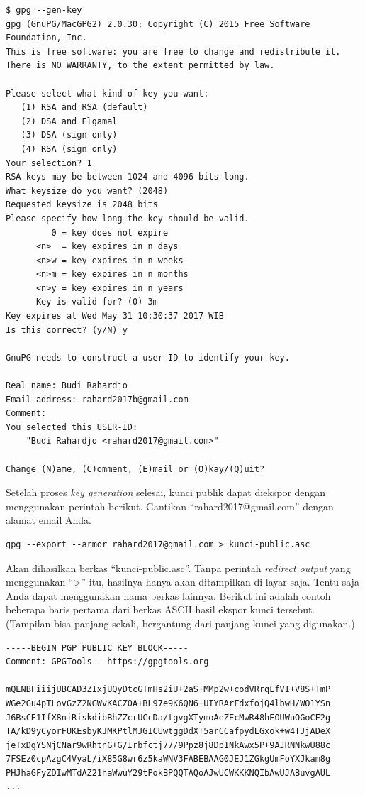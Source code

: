 \begin{verbatim}
$ gpg --gen-key
gpg (GnuPG/MacGPG2) 2.0.30; Copyright (C) 2015 Free Software Foundation, Inc.
This is free software: you are free to change and redistribute it.
There is NO WARRANTY, to the extent permitted by law.

Please select what kind of key you want:
   (1) RSA and RSA (default)
   (2) DSA and Elgamal
   (3) DSA (sign only)
   (4) RSA (sign only)
Your selection? 1
RSA keys may be between 1024 and 4096 bits long.
What keysize do you want? (2048)
Requested keysize is 2048 bits
Please specify how long the key should be valid.
         0 = key does not expire
      <n>  = key expires in n days
      <n>w = key expires in n weeks
      <n>m = key expires in n months
      <n>y = key expires in n years
      Key is valid for? (0) 3m
Key expires at Wed May 31 10:30:37 2017 WIB
Is this correct? (y/N) y

GnuPG needs to construct a user ID to identify your key.

Real name: Budi Rahardjo
Email address: rahard2017b@gmail.com
Comment:
You selected this USER-ID:
    "Budi Rahardjo <rahard2017@gmail.com>"

Change (N)ame, (C)omment, (E)mail or (O)kay/(Q)uit?
\end{verbatim}

Setelah proses {\em key generation} selesai, kunci publik dapat diekspor dengan
menggunakan perintah  berikut. Gantikan ``rahard2017@gmail.com'' dengan alamat
email Anda.

\begin{verbatim}
gpg --export --armor rahard2017@gmail.com > kunci-public.asc
\end{verbatim}

Akan dihasilkan berkas ``kunci-public.asc''. Tanpa perintah {\em redirect
output} yang menggunakan ``>'' itu, hasilnya hanya akan ditampilkan di layar
saja. Tentu saja Anda dapat menggunakan nama berkas lainnya.
Berikut ini adalah contoh beberapa baris pertama dari berkas ASCII hasil ekspor
kunci tersebut. (Tampilan bisa panjang sekali, bergantung dari panjang kunci
yang digunakan.)

\begin{verbatim}
-----BEGIN PGP PUBLIC KEY BLOCK-----
Comment: GPGTools - https://gpgtools.org

mQENBFiiijUBCAD3ZIxjUQyDtcGTmHs2iU+2aS+MMp2w+codVRrqLfVI+V8S+TmP
WGe2Gu4pTLovGzZ2NGWvKACZ0A+BL97e9K6QN6+UIYRArFdxfojQ4lbwH/WO1YSn
J6BsCE1IfX8niRiskdibBhZZcrUCcDa/tgvgXTymoAeZEcMwR48hEOUWuOGoCE2g
TA/kD9yCyorFUKEsbyKJMKPtlMJGICUwtggDdXT5arCCafpydLGxok+w4TJjADeX
jeTxDgYSNjCNar9wRhtnG+G/Irbfctj77/9Ppz8j8Dp1NkAwx5P+9AJRNNkwU88c
7FSEz0cpAzgC4VyaL/iX85G8wr6z5kaWNV3FABEBAAG0JEJ1ZGkgUmFoYXJkam8g
PHJhaGFyZDIwMTdAZ21haWwuY29tPokBPQQTAQoAJwUCWKKKNQIbAwUJABuvgAUL
...
\end{verbatim}

